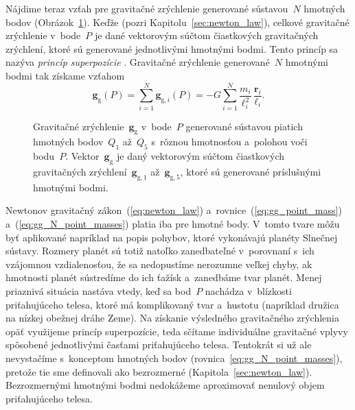 \documentclass[a4paper,12pt]{book}
\newcommand{\gidx}{\mathrm g}
\let\vec\mathbf
\begin{document}
Nájdime teraz vzťah pre gravitačné zrýchlenie generované sústavou~$N$ hmotných 
bodov (Obrázok~\ref{fig:gg_n_point_masses}).  Keďže  (pozri 
Kapitolu~\ref{sec:newton_law}), celkové gravitačné zrýchlenie v~bode~$P$ je 
dané vektorovým súčtom čiastkových gravitačných zrýchlení, ktoré sú generované 
jednotlivými hmotnými bodmi.  Tento princíp sa nazýva \emph{princíp 
superpozície} \parencite[pozri napríklad][]{Hotine}.  Gravitačné zrýchlenie 
generované~$N$ hmotnými bodmi tak získame vzťahom
%
\begin{equation}
\label{eq:gg_N_point_masses}
\vec g_\gidx(P) = \sum_{i = 1}^{N}\vec g_{\gidx,i}(P) = -G \sum_{i = 1}^{N}
\frac{m_i}{\ell_i^2} \, \frac{\vec r_i}{\ell_i}{.}
\end{equation}

\begin{figure}
\centering

\caption{Gravitačné zrýchlenie~$\vec g_\gidx$ v~bode~$P$ generované sústavou 
piatich hmotných bodov~$Q_1$ až~$Q_5$ s~rôznou hmotnosťou a~polohou voči 
bodu~$P$.  Vektor~$\vec g_\gidx$ je daný vektorovým súčtom čiastkových 
gravitačných zrýchlení~$\vec g_{\gidx,1}$ až~$\vec g_{\gidx,5}$, ktoré sú 
generované príslušnými hmotnými bodmi.}
\label{fig:gg_n_point_masses}
\end{figure}

Newtonov gravitačný zákon~(\ref{eq:newton_law}) 
a~rovnice~(\ref{eq:gg_point_mass}) a~(\ref{eq:gg_N_point_masses}) platia iba 
pre hmotné body.  V~tomto tvare môžu byť aplikované napríklad na popis pohybov, 
ktoré vykonávajú planéty Slnečnej sústavy.  Rozmery planét sú totiž natoľko 
zanedbateľné v~porovnaní s~ich vzájomnou vzdialenosťou, že sa nedopustíme 
nerozumne veľkej chyby, ak hmotnosti planét sústredíme do ich ťažísk 
a~zanedbáme tvar planét.  Menej priaznivá situácia nastáva vtedy, keď sa 
bod~$P$ nachádza v~blízkosti priťahujúceho telesa, ktoré má komplikovaný tvar 
a~hustotu (napríklad družica na nízkej obežnej dráhe Zeme).  Na získanie 
výsledného gravitačného zrýchlenia opäť využijeme princíp superpozície, teda 
sčítame individuálne gravitačné vplyvy spôsobené jednotlivými časťami 
priťahujúceho telesa.  Tentokrát si už ale nevystačíme s~konceptom hmotných 
bodov (rovnica~\ref{eq:gg_N_point_masses}), pretože tie sme definovali ako 
bezrozmerné (Kapitola~\ref{sec:newton_law}).  Bezrozmernými hmotnými bodmi 
nedokážeme aproximovať nenulový objem priťahujúceho telesa.
\end{document}
